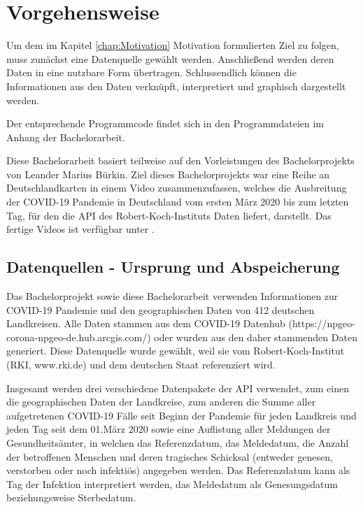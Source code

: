 \chapter{Vorgehensweise}\label{chap:Vorgehensweise}
Um dem im Kapitel \glqq{}\ref{chap:Motivation} Motivation\grqq{} formulierten Ziel zu folgen, muss zunächst eine Datenquelle gewählt werden.
Anschließend werden deren Daten in eine nutzbare Form übertragen.
Schlussendlich können die Informationen aus den Daten verknüpft, interpretiert und graphisch dargestellt werden.

Der entsprechende Programmcode findet sich in den Programmdateien im Anhang der Bachelorarbeit. 

Diese Bachelorarbeit basiert teilweise auf den Vorleistungen des Bachelorprojekts von Leander Marius Bürkin.
Ziel dieses Bachelorprojekts war eine Reihe an Deutschlandkarten in einem Video zusammenzufassen, welches die Ausbreitung der COVID-19 Pandemie in Deutschland vom ersten März 2020 bis zum letzten Tag, für den die API des Robert-Koch-Instituts Daten liefert, darstellt.
Das fertige Videos ist verfügbar unter .

\section{Datenquellen - Ursprung und Abspeicherung}\label{sec:Datenquelle}

Das Bachelorprojekt sowie diese Bachelorarbeit verwenden Informationen zur COVID-19 Pandemie und den geographischen Daten von 412 deutschen Landkreisen. Alle Daten stammen aus dem \glqq{}COVID-19 Datenhub\grqq{} (https://npgeo-corona-npgeo-de.hub.arcgis.com/) oder wurden aus den daher stammenden Daten generiert. Diese Datenquelle wurde gewählt, weil sie vom Robert-Koch-Institut (RKI, www.rki.de) und dem deutschen Staat referenziert wird.



Insgesamt werden drei verschiedene Datenpakete der API verwendet, zum einen die geographischen Daten der Landkreise, zum anderen die Summe aller aufgetretenen COVID-19 Fälle seit Beginn der Pandemie für jeden Landkreis und jeden Tag seit dem 01.März 2020 sowie eine Auflistung aller Meldungen der Gesundheitsämter, in welchen das  Referenzdatum, das Meldedatum, die Anzahl der betroffenen Menschen und deren tragisches Schicksal (entweder genesen, verstorben oder noch infektiös) angegeben werden. Das Referenzdatum kann als Tag der Infektion interpretiert werden, das Meldedatum als Genesungsdatum beziehungsweise Sterbedatum.

